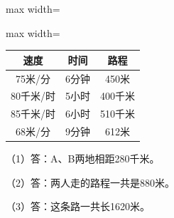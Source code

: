 
\begingroup\color{answerred}\par\smallskip\noindent\begin{adjustbox}{max width=\linewidth}\begin{adjustbox}{max width=\linewidth}\begin{tabular}{c|c|c}
\hline
速度&时间&路程\\\hline
75米/分&6分钟&450米\\
80千米/时&5小时&400千米\\
85千米/时&6小时&510千米\\
68米/分&9分钟&612米\\\hline
\end{tabular}\end{adjustbox}\end{adjustbox}\par\smallskip\par\endgroup
{}
\begingroup\color{answerred}\noindent（1）答：A、B两地相距280千米。\par
\noindent（2）答：两人走的路程一共是880米。\par
\noindent（3）答：这条路一共长1620米。\par\par\endgroup
